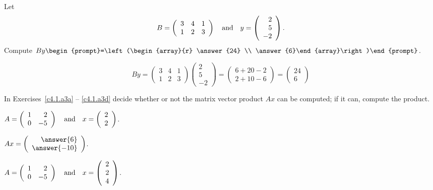 \documentclass{ximera}
\begin{document}
\begin{exercise} \label{c4.1.2}
Let
\[
B=\left(\begin{array}{ccc} 3 & 4 & 1\\ 1& 2 & 3 \end{array}\right)
\quad\mbox{and}\quad y=\left(\begin{array}{r} 2 \\ 5 \\ -2 \end{array}\right).
\]
Compute $By\begin{prompt}=\left(\begin{array}{r} \answer{24} \\ \answer{6}\end{array}\right)\end{prompt}$.
\begin{hint}
  \[
By =
\left(\begin{array}{rrr} 3 & 4 & 1 \\ 1 & 2 & 3\end{array}\right)
\left(\begin{array}{r} 2 \\ 5 \\ -2\end{array}\right) = 
\left(\begin{array}{r} 6 + 20 - 2 \\ 2 + 10 - 6\end{array}\right) =
\left(\begin{array}{r} 24 \\ 6\end{array}\right)
\]
\end{hint}
\end{exercise}

\noindent In Exercises~\ref{c4.1.a3a} -- \ref{c4.1.a3d} decide whether or
not the matrix vector product $Ax$ can be computed; if it can, compute the
product.
\begin{exercise} \label{c4.1.a3a}
  $A=\left(\begin{array}{rr} 1 & 2\\ 0 &-5\end{array}\right) \quad\mbox{and}\quad x = \left(\begin{array}{r} 2 \\ 2\end{array}\right)$.
  \begin{multipleChoice}
  \end{multipleChoice}
  \begin{exercise}
    $Ax = \vectwo{\answer{6}}{\answer{-10}}$.
  \end{exercise}
\end{exercise}

\begin{exercise} \label{c4.1.a3b}
$A=\left(\begin{array}{rr} 1 & 2\\ 0 &-5\end{array}\right) \quad\mbox{and}\quad
x = \left(\begin{array}{r} 2\\ 2 \\4\end{array}\right)$.
  \begin{multipleChoice}
  \end{multipleChoice}
\end{exercise}
\end{document}

